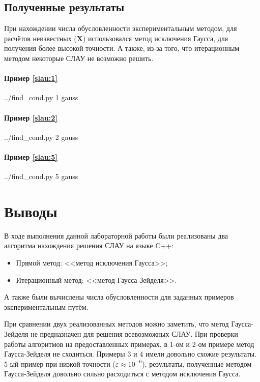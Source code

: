 \documentclass[a4paper]{article}
\newcommand{\m}[1]{\ensuremath{\bm{#1}}}
\begin{document}
\subsection{Полученные результаты}

При нахождении числа обусловленности экспериментальным методом, для расчётов неизвестных ($\m{X}$) использовался метод исключения Гаусса, для получения более высокой точности. А также, из-за того, что итерационным методом некоторые СЛАУ не возможно решить.

\paragraph{Пример \eqref{slau:1}}
\bash[stdout]
../find_cond.py 1 gauss
\END

\paragraph{Пример \eqref{slau:2}}
\bash[stdout]
../find_cond.py 2 gauss
\END

\paragraph{Пример \eqref{slau:5}}
\bash[stdout]
../find_cond.py 5 gauss
\END

\section{Выводы}
В ходе выполнения данной лабораторной работы были реализованы два алгоритма нахождения решения СЛАУ на языке C++:
\begin{itemize}
    \item Прямой метод: <<метод исключения Гаусса>>;
    \item Итерационный метод: <<метод Гаусса-Зейделя>>.
\end{itemize}
А также были вычислены числа обусловленности для заданных примеров экспериментальным путём.

\bigskip

При сравнении двух реализованных методов можно заметить, что метод Гаусса-Зейделя не предназначен для решения всевозможных СЛАУ.
При проверки работы алгоритмов на предоставленных примерах, в 1-ом и 2-ом примере метод Гаусса-Зейделя не сходиться. Примеры 3 и 4 имели довольно схожие результаты.
5-ый пример при низкой точности ($\varepsilon \approx 10^{-6}$), результаты, полученные методом Гаусса-Зейделя довольно сильно расходиться с методом исключения Гаусса. 
\end{document}
